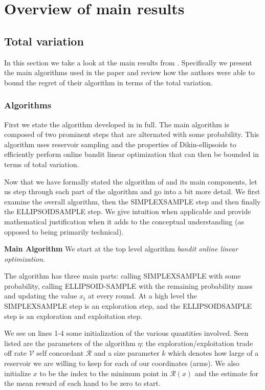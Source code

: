 \section{Overview of main results}

\subsection{Total variation}
In this section we take a look at the main results from \citep{hazan}.
Specifically we present the main algorithms used in the paper and review 
how the authors were able to bound the regret of their algorithm in terms 
of the total variation.

\subsubsection{Algorithms}
First we state the algorithm developed in \citep{hazan} in full. The
main algorithm is composed of two prominent steps that are alternated with 
some probability. This algorithm uses reservoir sampling and the 
properties of Dikin-ellipsoids to efficiently perform online bandit linear
optimization that can then be bounded in terms of total variation.


\unskip

\unskip

\unskip

Now that we have formally stated the algorithm of \citep{hazan} and its main
components, let us step through each part of the algorithm and go into a 
bit more detail. We first examine the overall algorithm, then the 
SIMPLEXSAMPLE step and then finally the ELLIPSOIDSAMPLE step. We
give intuition when applicable and provide mathematical justification when
it adds to the conceptual understanding (as opposed to being primarily technical).

\textbf{Main Algorithm}
We start at the top level algorithm \textit{bandit online linear optimization}.

The algorithm has three main parts: calling SIMPLEXSAMPLE with some probability, calling ELLIPSOID-SAMPLE with the remaining probability mass and updating the value $x_t$ at every round. At a high level the SIMPLEXSAMPLE step is an exploration step, and the ELLIPSOIDSAMPLE step is an exploration and exploitation step.

We see on lines 1-4 some initialization of the various quantities involved. Seen listed are the parameters of the algorithm $\eta$: the exploration/exploitation trade off rate $\mathcal{V}$ self concordant $\mathcal{R}$ and a size parameter $k$ which denotes how large of a reservoir we are willing to keep for each of our coordinates (arms). We also initialize $x$ to be the index to the minimum point in $\mathcal{R}(x)$  and the estimate for the mean reward of each hand to be zero to start.

